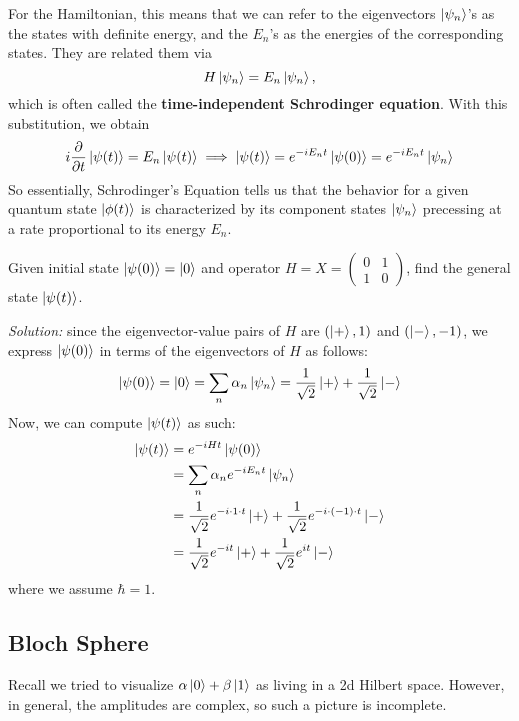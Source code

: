 For the Hamiltonian, this means that we can refer to the eigenvectors $\ket{\psi_n}$'s as the states with definite energy, and the $E_n$'s as the energies of the corresponding states. They are related them via
\[ H \ket{\psi_n} = E_n \ket{\psi_n},\]
which is often called the \textbf{time-independent Schrodinger equation}. With this substitution, we obtain
\[ i \pdv{}{t} \ket{\psi(t)} = E_n \ket{\psi(t)} \implies \ket{\psi(t)} = e^{-i E_n t} \ket{\psi(0)} = e^{-i E_n t} \ket{\psi_n} \]
So essentially, Schrodinger's Equation tells us that the behavior for a given quantum state $\ket{\phi(t)}$ is characterized by its component states $\ket{\psi_n}$ precessing at a rate proportional to its energy $E_n$. 

\begin{example}
    Given initial state $\ket{\psi(0)} = \ket 0$ and operator $H = X = \begin{pmatrix}
        0 & 1 \\
        1 & 0 
    \end{pmatrix}$, find the general state $\ket{\psi(t)}$.

    \emph{Solution:} since the eigenvector-value pairs of $H$ are $(\ket+, 1)$ and $(\ket-, -1)$, we express $\ket{\psi(0)}$ in terms of the eigenvectors of $H$ as follows:
    \[\ket{\psi(0)} = \ket 0 = \sum_n \alpha_n \ket{\psi_n} = \frac{1}{\sqrt{2}} \ket{+} + \frac{1}{\sqrt{2}} \ket -\]
    Now, we can compute $\ket{\psi(t)}$ as such:
    \begin{align*}
        \ket{\psi(t)} &= e^{-i H t} \ket{\psi(0)} \\
        &= \sum_n \alpha_n e^{-i E_n t} \ket{\psi_n} \\
        &= \frac{1}{\sqrt{2}} e^{-i \cdot 1 \cdot t} \ket{+} + \frac{1}{\sqrt{2}}e^{-i \cdot (-1) \cdot t} \ket - \\
        &= \frac{1}{\sqrt{2}} e^{-it} \ket{+} + \frac{1}{\sqrt{2}}e^{it} \ket -
    \end{align*}
    where we assume $\hbar = 1$.
\end{example}
\subsection{Bloch Sphere}
Recall we tried to visualize $\alpha\ket{0} + \beta\ket{1}$ as living in a 2d Hilbert space. However, in general, the amplitudes are
complex, so such a picture is incomplete.

